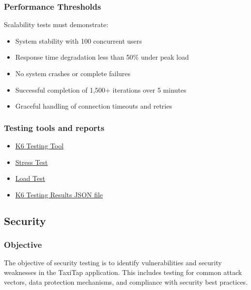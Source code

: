 \documentclass[a4paper,12pt]{article}
\begin{document}
\subsubsection{Performance Thresholds}
Scalability tests must demonstrate:
\begin{itemize}
    \item System stability with 100 concurrent users
    \item Response time degradation less than 50\% under peak load
    \item No system crashes or complete failures
    \item Successful completion of 1,500+ iterations over 5 minutes
    \item Graceful handling of connection timeouts and retries
\end{itemize}

\subsubsection{Testing tools and reports}
\begin{itemize}
 \item \href{https://k6.io/}{K6 Testing Tool}
 \item \href{https://github.com/COS301-SE-2025/TaxiTap/blob/00164c31e7b00acd4b7aab6527f9ad9b59471b28/testing/k6/taxi_tap_stress_test.js}{Stress Test}
 \item \href{https://github.com/COS301-SE-2025/TaxiTap/blob/00164c31e7b00acd4b7aab6527f9ad9b59471b28/testing/k6/taxi_tap_load_test.js}{Load Test}
 \item \href{https://github.com/COS301-SE-2025/TaxiTap/blob/021738a91c927c882667497c58980bd63b813954/testing/k6/summary.json}{K6 Testing Results JSON file}
\end{itemize}

\subsection{Security}

\subsubsection{Objective}
The objective of security testing is to identify vulnerabilities and security weaknesses in the TaxiTap application. This includes testing for common attack vectors, data protection mechanisms, and compliance with security best practices.
\end{document}
